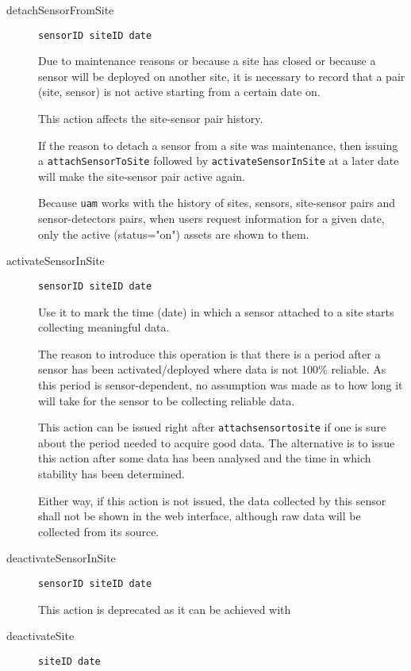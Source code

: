 \documentclass[12pt]{amsart}
\begin{document}
\begin{description}
\item[detachSensorFromSite] {\tt sensorID siteID  date} 

Due to maintenance reasons or because a site has closed or because a sensor will be deployed on another site, it is necessary to record that a pair (site, sensor) is not active starting from a certain date on.

This action affects the site-sensor pair history. 

If the reason to detach a sensor from a site was maintenance, then issuing a {\tt attachSensorToSite} followed by {\tt activateSensorInSite} at a later date will make the site-sensor pair active again.

Because {\tt uam} works with the history of sites, sensors, site-sensor pairs and sensor-detectors pairs, when users request information for a given date, only the active (status="on") assets are shown to them.

\item[activateSensorInSite] {\tt sensorID siteID date}

Use it to mark the time (date) in which a sensor attached to a site starts collecting meaningful data.

The reason to introduce this operation is that  there is a period after a sensor has been activated/deployed where data is not 100\% reliable. As this period is sensor-dependent, no assumption was made as to how long it will take for the sensor to be collecting reliable data.

This action can be issued right after {\tt attachsensortosite} if one is sure about the period needed to acquire good data. The alternative is to issue this action after some data has been analysed and the time in which stability has been determined. 

Either way, if this action is not issued, the data collected by this sensor shall not be shown in the web interface, although raw data will be collected from its source.

\item[deactivateSensorInSite] {\tt sensorID siteID date}

This action is deprecated as it can be achieved with 


\item[deactivateSite] {\tt siteID date}


\end{description}
\end{document}
